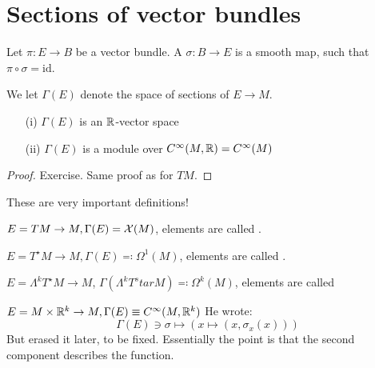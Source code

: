 \section{Sections of vector bundles}

\begin{definition*}
    Let \(\pi:E\to B\) be a vector bundle. A  \(\sigma:B\to E\) is a 
    smooth map, such that \(\pi\circ \sigma=\text{id}\).
\end{definition*}
We let \(\Gamma(E)\) denote the space of sections of \(E \to M\). 

\begin{lemma}\label{lem:8.5}
    \begin{enumerate}
        \item[(i)] \(\Gamma(E)\) is an \(\mathbb{R}\)-vector space 
        \item[(ii)] \(\Gamma(E)\) is a module over \(C^\infty(M,\mathbb{R})=C^\infty(M)\)  
    \end{enumerate}
\end{lemma}

\begin{proof}
    Exercise. Same proof as for \(TM\).
\end{proof}

These are very important definitions!

\begin{example}
    \(E=TM\to M,\Gamma(E)=\mathcal{X}(M)\), elements are called .
\end{example}

\begin{example}
    \(E=T^\star M\to M,\Gamma(E)\eqqcolon \Omega^1(M)\), elements are called .
\end{example}

\begin{example}
    \(E=\Lambda^k T^\star M \to M\), \(\Gamma(\Lambda^k T^star M)\eqqcolon \Omega^k(M)\), elements are called 
\end{example}

\begin{example}
    \(E=M\times \mathbb{R}^k\to M, \Gamma(E)\equiv C^\infty(M,\mathbb{R}^k)\)
    He wrote: %
    \[\Gamma(E)\ni\sigma\mapsto (x\mapsto (x,\sigma_x(x)))\]
    But erased it later, to be fixed. Essentially the point is that the second component describes the function.
\end{example}

